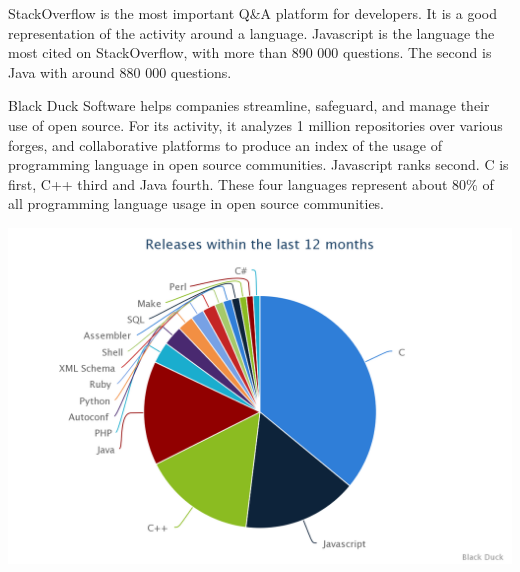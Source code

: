 
StackOverflow is the most important Q\&A platform for developers.
It is a good representation of the activity around a language.
Javascript is the language the most cited on StackOverflow, with more than 890 000 questions.
The second is Java with around 880 000 questions.

Black Duck Software helps companies streamline, safeguard, and manage their use of open source.
For its activity, it analyzes 1 million repositories over various forges, and collaborative platforms to produce an index of the usage of programming language in open source communities.
Javascript ranks second.
C is first, C++ third and Java fourth.
These four languages represent about 80\% of all programming language usage in open source communities.

\includegraphics[width=0.9\linewidth]{../../data/js-trends/black-duck-15}



